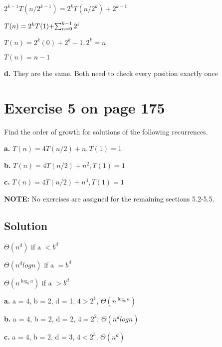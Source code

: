 \documentclass[11pt]{article}
\begin{document}
\(2^{k-1}T(n/2^{k-1}) = 2^kT(n/2^k) + 2^{k-1}\)

\(T(n) = 2^kT(1) + $$\sum_{n=0}^{k-1} 2^i $$ \)

\(T(n) = 2^k(0) + 2^k - 1, 2^k = n \)

\(T(n) = n - 1\)

\textbf{d.} They are the same. Both need to check every position exactly once

\section*{Exercise 5 on page 175}
\label{sec-3}


Find the order of growth for solutions of the following recurrences.

\textbf{a.} \(T(n) = 4T(n/2) + n, T(1) = 1\)

\textbf{b.} \(T(n) = 4T(n/2) + n^2, T(1) = 1\)

\textbf{c.} \(T(n) = 4T(n/2) + n^3, T(1) = 1\)

\textbf{NOTE:} No exercises are assigned for the remaining sections 5.2-5.5.

\subsection*{Solution}
\label{sec-3.1}



\(\Theta(n^d)\) if a \(< b^d\)

\(\Theta(n^dlogn)\) if a \(= b^d\)

\(\Theta(n^{\log_b a})\) if a \(> b^d\)

\textbf{a.}
a = 4, b = 2, d = 1, \(4 > 2^1\), \(\Theta(n^{\log_b a})\)

\textbf{b.}
a = 4, b = 2, d = 2, \(4 = 2^2\), \(\Theta(n^dlogn)\)

\textbf{c.}
a = 4, b = 2, d = 3, \(4 < 2^3\), \(\Theta(n^d)\)
\end{document}
